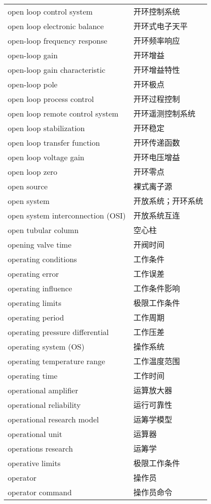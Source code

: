 \documentclass[
]{article}
\begin{document}
\begin{longtable}[]{@{}ll@{}}
open loop control system & 开环控制系统 \\
open loop electronic balance & 开环式电子天平 \\
open-loop frequency response & 开环频率响应 \\
open-loop gain & 开环增益 \\
open-loop gain characteristic & 开环增益特性 \\
open-loop pole & 开环极点 \\
open loop process control & 开环过程控制 \\
open loop remote control system & 开环遥测控制系统 \\
open loop stabilization & 开环稳定 \\
open loop transfer function & 开环传递函数 \\
open loop voltage gain & 开环电压增益 \\
open loop zero & 开环零点 \\
open source & 裸式离子源 \\
open system & 开放系统；开环系统 \\
open system interconnection (OSI) & 开放系统互连 \\
open tubular column & 空心柱 \\
opening valve time & 开阀时间 \\
operating conditions & 工作条件 \\
operating error & 工作误差 \\
operating influence & 工作条件影响 \\
operating limits & 极限工作条件 \\
operating period & 工作周期 \\
operating pressure differential & 工作压差 \\
operating system (OS) & 操作系统 \\
operating temperature range & 工作温度范围 \\
operating time & 工作时间 \\
operational amplifier & 运算放大器 \\
operational reliability & 运行可靠性 \\
operational research model & 运筹学模型 \\
operational unit & 运算器 \\
operations research & 运筹学 \\
operative limits & 极限工作条件 \\
operator & 操作员 \\
operator command & 操作员命令 \\

\end{longtable}
\end{document}
